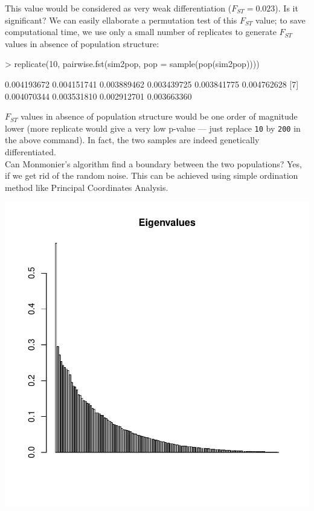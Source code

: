 \documentclass{article}
\begin{document}
\noindent This value would be considered as very weak differentiation ($F_{ST}=0.023$).
Is it significant?
We can easily ellaborate a permutation test of this $F_{ST}$ value; to save computational time, we
use only a small number of replicates to generate $F_{ST}$ values in absence of population structure:
\begin{Schunk}
\begin{Sinput}
> replicate(10, pairwise.fst(sim2pop, pop = sample(pop(sim2pop))))
\end{Sinput}
\begin{Soutput}
 [1] 0.004193672 0.004151741 0.003889462 0.003439725 0.003841775 0.004762628
 [7] 0.004070344 0.003531810 0.002912701 0.003663360
\end{Soutput}
\end{Schunk}
$F_{ST}$ values in absence of population structure would be one order of magnitude lower (more
replicate would give a very low p-value --- just replace \texttt{10} by \texttt{200} in the above command).
In fact, the two samples are indeed genetically differentiated.
\\

Can Monmonier's algorithm find a boundary between the two populations?
Yes, if we get rid of the random noise.
This can be achieved using simple ordination method like Principal Coordinates Analysis.

\begin{Schunk}
\end{Schunk}
\includegraphics{figs/base-mon6}
\end{document}
